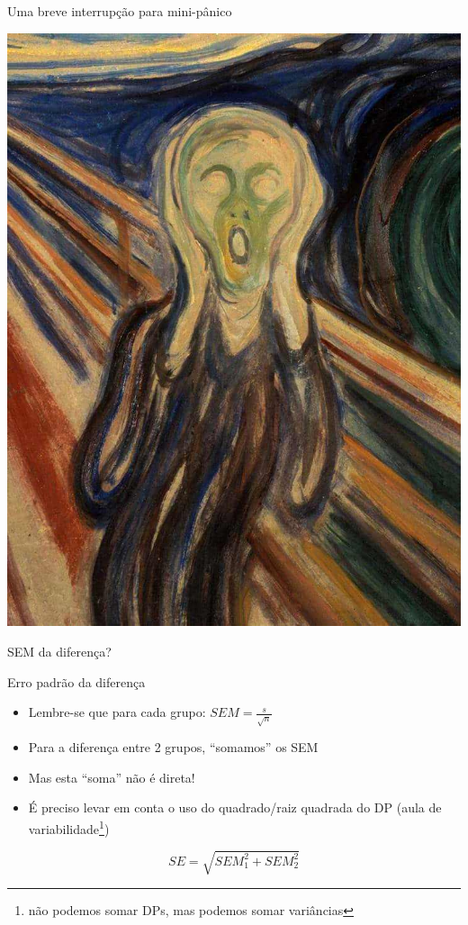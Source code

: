 \documentclass{beamer}
\begin{document}
\begin{frame}{Uma breve interrupção para mini-pânico}
  \begin{center}
    \includegraphics[height=.7\textheight]{Cap7/ogrito}
  \end{center}
  \begin{block}{}
    \begin{center}
      SEM da diferença?
    \end{center}
  \end{block}
\end{frame}

\begin{frame}{Erro padrão da diferença}
  \begin{itemize}
  \item Lembre-se que para cada grupo: $SEM = \frac{s}{\sqrt{n}}$
  \item Para a diferença entre 2 grupos, ``somamos'' os SEM
  \item Mas esta ``soma'' não é direta!
  \item É preciso levar em conta o uso do quadrado/raiz quadrada do DP (aula de variabilidade\footnote{não podemos somar DPs, mas podemos somar variâncias})
  \end{itemize}
  \begin{block}{}
      \begin{displaymath}
    SE = \sqrt{SEM_1^2 + SEM_2^2}
  \end{displaymath}
  \end{block}
\end{frame}
\end{document}
